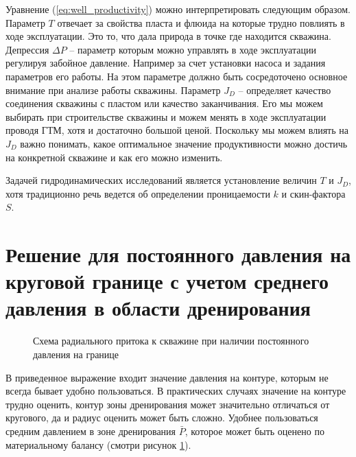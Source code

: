 Уравнение (\ref{eq:well_productivity}) можно интерпретировать следующим образом. Параметр $T$ отвечает за свойства пласта и флюида на которые трудно повлиять в ходе эксплуатации. Это то, что дала природа в точке где находится скважина. Депрессия $\Delta P$ -- параметр которым можно управлять в ходе эксплуатации регулируя забойное давление. Например за счет установки насоса и задания параметров его работы. На этом параметре должно быть сосредоточено основное внимание при анализе работы скважины. Параметр $J_D$ -- определяет качество соединения скважины с пластом или качество заканчивания. Его мы можем выбирать при строительстве скважины и можем менять в ходе эксплуатации проводя ГТМ, хотя и достаточно большой ценой. Поскольку мы можем влиять на $J_D$ важно понимать, какое оптимальное значение продуктивности можно достичь на конкретной скважине и как его можно изменить. 

Задачей гидродинамических исследований является установление величин $T$ и $J_D$, хотя традиционно речь ведется об определении проницаемости $k$ и скин-фактора $S$. 




\section{Решение для постоянного давления на круговой границе с учетом среднего давления в области дренирования}

\begin{figure}[h!]
	\begin{center}
		
		\caption{Схема радиального притока к скважине при наличии постоянного давления на границе}
		\label{ris:radial_inflow_steady_state_average_pressure}
	\end{center}
\end{figure}

В приведенное выражение входит значение давления на контуре, которым не всегда бывает удобно пользоваться. В практических случаях значение на контуре трудно оценить, контур зоны дренирования может значительно отличаться от кругового, да и радиус оценить может быть сложно. Удобнее пользоваться средним давлением в зоне дренирования $\bar{P}$, которое может быть оценено по материальному балансу (смотри рисунок \ref{ris:radial_inflow_steady_state_average_pressure}). 



